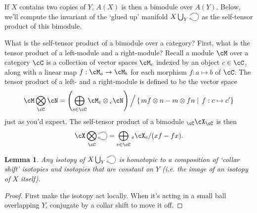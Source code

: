 \documentclass[11pt]{amsart}
\theoremstyle{plain}
\newtheorem{lem}[prop]{Lemma}
\newcommand{\selfarrow}{\ensuremath{\smash{\tikz[baseline]{\clip (0,0.36) rectangle (0.48,-0.16); \draw[->] (0,0.175) .. controls (0.6,0.65) and (0.6,-0.45) .. (0,0.025);}}}}
\newcommand{\tensor}{\otimes}
\newcommand{\Tensor}{\bigotimes}
\newcommand{\DirectSum}{\bigoplus}
\newcommand{\setc}[2]{\setcl{#1}{#2}}
\newcommand{\setcl}[2]{\left\{ \left. #1 \;\right| \; #2 \right\}}
\begin{document}
If $X$ contains two copies of $Y$, $A(X)$ is then a bimodule over $A(Y)$. Below, we'll compute the invariant of the `glued up' manifold $X \bigcup_Y \selfarrow$ as the self-tensor product of this bimodule.

What is the self-tensor product of a bimodule over a category? First, what is the tensor product of a left-module and a right-module? Recall a module $\cM$ over a category $\cC$ is a collection of vector spaces $\cM_c$ indexed by an object $c \in \cC$, along with a linear map $f: \cM_a \to \cM_b$ for each morphism $f:a \mapsto b$ of $\cC$. The tensor product of a left- and a right-module is defined to be the vector space
$$\cM \Tensor_\cC \cN = \left(\DirectSum_{c \in \cC} \cM_c \tensor {}_c\cN\right) \Big/ \setc{mf \tensor n - m \tensor fn}{f: c \mapsto c'}$$
just as you'd expect. The self-tensor product of a bimodule ${}_{\cC}\cX_{\cC}$ is then
$$\cX \Tensor_{\cC} \selfarrow = \DirectSum_{c \in \cC} {}_c \cX_c / (xf - fx).$$ 


\begin{lem}
Any isotopy of $X \bigcup_Y \selfarrow$ is homotopic to a composition of `collar shift' isotopies and isotopies that are constant on $Y$ (i.e. the image of an isotopy of $X$ itself).
\end{lem}
\begin{proof}
First make the isotopy act locally. When it's acting in a small ball overlapping $Y$, conjugate by a collar shift to move it off.
\end{proof}
\end{document}
